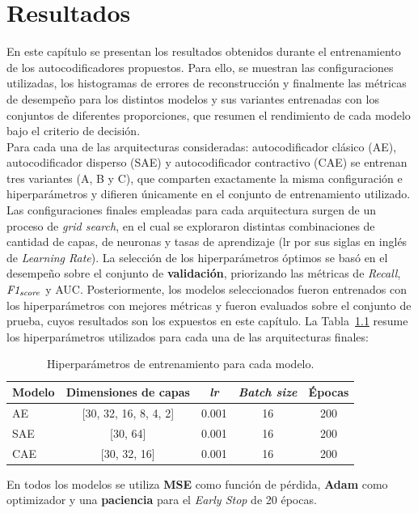 \documentclass[a4paper,10pt]{book}
\begin{document}
\chapter{Resultados}

En este capítulo se presentan los resultados obtenidos durante el entrenamiento de los autocodificadores propuestos. Para ello, se muestran las configuraciones utilizadas, los histogramas de errores de reconstrucción y finalmente las métricas de desempeño para los distintos modelos y sus variantes entrenadas con los conjuntos de diferentes proporciones, que resumen el rendimiento de cada modelo bajo el criterio de decisión.\\

Para cada una de las arquitecturas consideradas: autocodificador clásico (AE), autocodificador disperso (SAE) y autocodificador contractivo (CAE) se entrenan tres variantes (A, B y C), que comparten exactamente la misma configuración e hiperparámetros y difieren únicamente en el conjunto de entrenamiento utilizado.\\

Las configuraciones finales empleadas para cada arquitectura surgen de un proceso de \emph{grid search}, en el cual se exploraron distintas combinaciones de cantidad de capas, de neuronas y tasas de aprendizaje (lr por sus siglas en inglés de \emph{Learning Rate}). La selección de los hiperparámetros óptimos se basó en el desempeño sobre el conjunto de \textbf{validación}, priorizando las métricas de \emph{Recall}, $\emph{F1}_{\emph{score}}$ y AUC. Posteriormente, los modelos seleccionados fueron entrenados con los hiperparámetros con mejores métricas y fueron evaluados sobre el conjunto de prueba, cuyos resultados son los expuestos en este capítulo. La Tabla~\ref{tab:hiperparametros_modelos} resume los hiperparámetros utilizados para cada una de las arquitecturas finales:
\begin{table}[H]
	\centering
	\caption{Hiperparámetros de entrenamiento para cada modelo.}
	\begin{tabular}{lcccc}
		\toprule
		\textbf{Modelo} &
		\textbf{Dimensiones de capas} &
		\textbf{\emph{lr}} &
		\textbf{\emph{Batch size}} &
		\textbf{Épocas} \\
		\midrule
		AE  & [30, 32, 16, 8, 4, 2] & 0.001 & 16 & 200 \\
		SAE & [30, 64] & 0.001 & 16 & 200 \\
		CAE & [30, 32, 16] & 0.001 & 16 & 200 \\
		\bottomrule
	\end{tabular}
	\label{tab:hiperparametros_modelos}
\end{table}
\noindent
En todos los modelos se utiliza \textbf{MSE} como función de pérdida, \textbf{Adam} como optimizador y una \textbf{paciencia} para el \emph{Early Stop} de 20 épocas.
\end{document}
